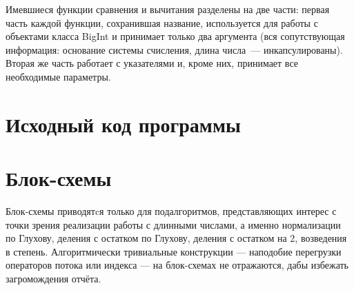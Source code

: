 \documentclass[a4paper,12pt]{article} %
\begin{document}
Имевшиеся функции сравнения и вычитания разделены на две части:
первая часть каждой функции, сохранившая название,
используется для работы с объектами класса BigInt
и принимает только два аргумента
(вся сопутствующая информация: основание системы счисления, длина числа~--- инкапсулированы).
Вторая же часть работает с указателями и, кроме них, принимает все необходимые параметры.


\section*{Исходный код программы}







\section*{Блок-схемы}

Блок-схемы приводятcя только для подалгоритмов, представляющих интерес с точки зрения реализации работы с длинными числами,
а именно нормализации по Глухову, деления с остатком по Глухову,
деления с остатком на 2, возведения в степень.
Алгоритмически тривиальные конструкции --- наподобие перегрузки операторов потока или индекса --- на блок-схемах не отражаются,
дабы избежать загромождения отчёта.
\end{document}
